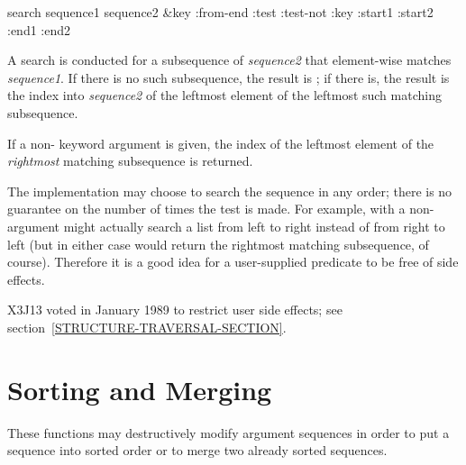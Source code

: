 \begin{defun}[Function]
search sequence1 sequence2 &key :from-end :test :test-not :key :start1 :start2 :end1 :end2

A search is conducted for a subsequence of \emph{sequence2} that
element-wise matches \emph{sequence1}.
If there is no such subsequence, the result is {\false}; if there is,
the result is the index into \emph{sequence2} of the leftmost element
of the leftmost such matching subsequence.

If a non-{\false}  keyword argument is given,
the index of the leftmost
element of the \emph{rightmost} matching subsequence is returned.

The implementation may choose to search the sequence in any order;
there is no guarantee on the number of times the test is made.
For example,  with a non-{\nil} 
argument might actually search a list from left to right
instead of from right to left (but in either case would return
the rightmost matching subsequence, of course).  Therefore it is a good
idea for a user-supplied predicate to be free of side effects.

\begin{new}
X3J13 voted in January 1989
to restrict user side effects; see section~\ref{STRUCTURE-TRAVERSAL-SECTION}.
\end{new}
\end{defun}

\section{Sorting and Merging}

These functions may destructively modify argument sequences
in order to put a sequence into sorted order or to merge two
already sorted sequences.

